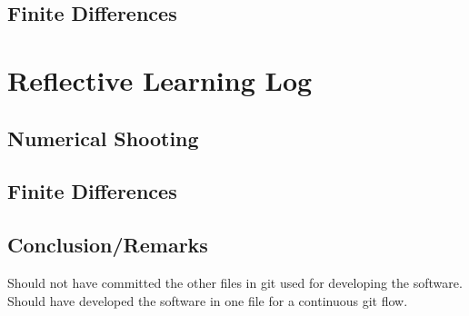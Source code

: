 \documentclass[10pt]{article}
\begin{document}
\begin{multicols}{2}
\subsection{Finite Differences}



\section{Reflective Learning Log}






\subsection{Numerical Shooting}



\subsection{Finite Differences}



\subsection{Conclusion/Remarks}

Should not have committed the other files in git used for developing the software.
Should have developed the software in one file for a continuous git flow.


\end{multicols}


\printbibliography 
\end{document}
